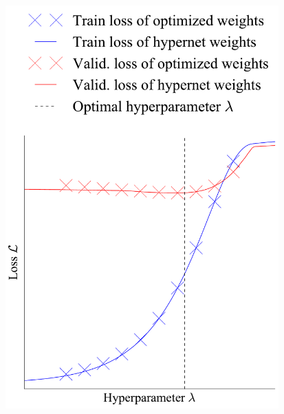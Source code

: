 \documentclass[landscape,a0b,final,a4resizeable]{include/a0poster}
\begin{document}
\begin{poster}
\begin{multicols}{3}
\begin{minipage}[c]{36cm}
\begin{center}
	\includegraphics[trim={0 0 0 9cm},clip,width=10.5cm]{figures/hypernets_global_small.pdf}

\end{center}
\end{minipage}
\end{multicols}
\end{poster}
\end{document}
